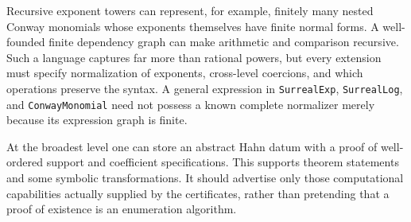 \documentclass[11pt,letterpaper]{article}
\numberwithin{equation}{section}
\theoremstyle{definition}
\theoremstyle{remark}\newtheorem{remark}[theorem]{Remark}
\begin{document}
Recursive exponent towers can represent, for example, finitely many nested
Conway monomials whose exponents themselves have finite normal forms. A
well-founded finite dependency graph can make arithmetic and comparison
recursive. Such a language captures far more than rational powers, but every
extension must specify normalization of exponents, cross-level coercions,
and which operations preserve the syntax. A general expression in
\texttt{SurrealExp}, \texttt{SurrealLog}, and \texttt{ConwayMonomial} need not
possess a known complete normalizer merely because its expression graph is finite.

At the broadest level one can store an abstract Hahn datum with a proof of
well-ordered support and coefficient specifications. This supports theorem
statements and some symbolic transformations. It should advertise only those
computational capabilities actually supplied by the certificates, rather than
pretending that a proof of existence is an enumeration algorithm.
\end{document}
